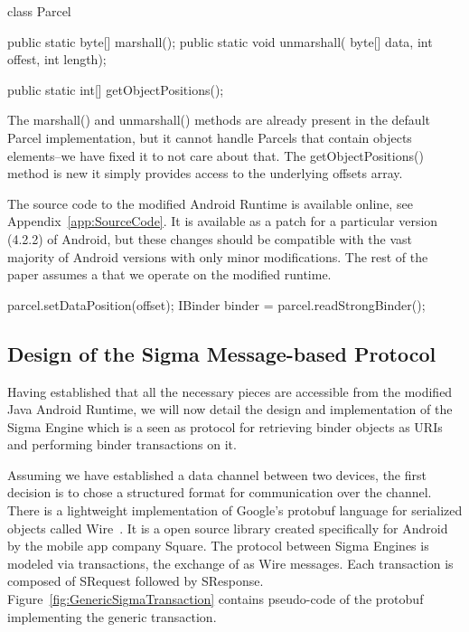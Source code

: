 \documentclass[prodmode]{acmlarge}
\begin{document}
\begin{snippet}
class Parcel {
  public static byte[] marshall();
  public static void unmarshall(
      byte[] data, int offest, int length);

  public static int[] getObjectPositions();
}
\end{snippet}

The marshall() and unmarshall() methods are already present in the default Parcel implementation, but it cannot handle Parcels that contain objects elements--we have fixed it to not care about that. The getObjectPositions() method is new it simply provides access to the underlying offsets array.

The source code to the modified Android Runtime is available online, see Appendix~\ref{app:SourceCode}. It is available as a patch for a particular version (4.2.2) of Android, but these changes should be compatible with the vast majority of Android versions with only minor modifications. The rest of the paper assumes a that we operate on the modified runtime.

\begin{snippet}
parcel.setDataPosition(offset);
IBinder binder = parcel.readStrongBinder();
\end{snippet}

\subsection{Design of the Sigma Message-based Protocol}
Having established that all the necessary pieces are accessible from the modified Java Android Runtime, we will now detail the design and implementation of the Sigma Engine which is a seen as protocol for retrieving binder objects as URIs and performing binder transactions on it.

Assuming we have established a data channel between two devices, the first decision is to chose a structured format for communication over the channel. There is a lightweight implementation of Google's protobuf language for serialized objects called Wire~\cite{Wire,IntroWire}. It is a open source library created specifically for Android by the mobile app company Square. The protocol between Sigma Engines is modeled via transactions, the exchange of as Wire messages. Each transaction is composed of SRequest followed by SResponse. Figure~\ref{fig:GenericSigmaTransaction} contains pseudo-code of the protobuf implementing the generic transaction.
\end{document}
